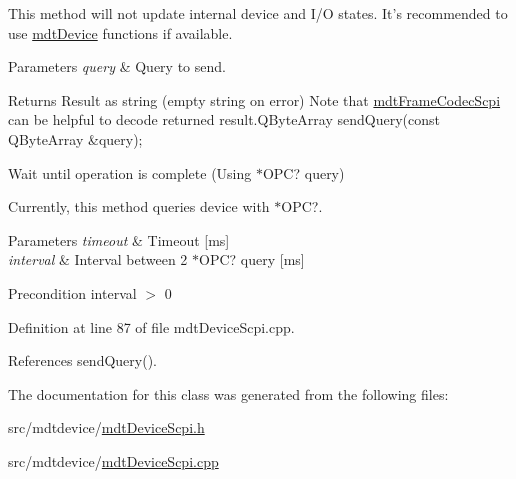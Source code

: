 This method will not update internal device and I/\-O states. It's recommended to use \hyperlink{classmdt_device}{mdt\-Device} functions if available.


\begin{DoxyParams}{Parameters}
{\em query} & Query to send. \\
\hline
\end{DoxyParams}
\begin{DoxyReturn}{Returns}
Result as string (empty string on error) Note that \hyperlink{classmdt_frame_codec_scpi}{mdt\-Frame\-Codec\-Scpi} can be helpful to decode returned result.\-Q\-Byte\-Array send\-Query(const Q\-Byte\-Array \&query);
\end{DoxyReturn}
Wait until operation is complete (Using $\ast$\-O\-P\-C? query)

Currently, this method queries device with $\ast$\-O\-P\-C?.


\begin{DoxyParams}{Parameters}
{\em timeout} & Timeout \mbox{[}ms\mbox{]} \\
\hline
{\em interval} & Interval between 2 $\ast$\-O\-P\-C? query \mbox{[}ms\mbox{]} \\
\hline
\end{DoxyParams}
\begin{DoxyPrecond}{Precondition}
interval $>$ 0 
\end{DoxyPrecond}


Definition at line 87 of file mdt\-Device\-Scpi.\-cpp.



References send\-Query().



The documentation for this class was generated from the following files\-:\begin{DoxyCompactItemize}
\item 
src/mdtdevice/\hyperlink{mdt_device_scpi_8h}{mdt\-Device\-Scpi.\-h}\item 
src/mdtdevice/\hyperlink{mdt_device_scpi_8cpp}{mdt\-Device\-Scpi.\-cpp}\end{DoxyCompactItemize}

